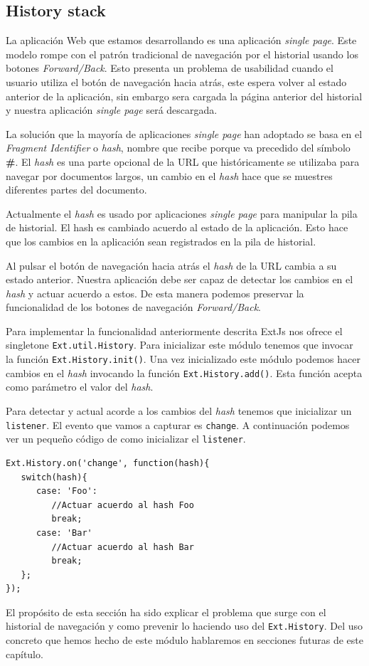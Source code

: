 	\subsection{History stack}
		La aplicación Web que estamos desarrollando es una aplicación \emph{single page}. Este modelo rompe con el patrón tradicional de
		navegación por el historial usando los botones \emph{Forward/Back}. Esto presenta un problema de usabilidad cuando el usuario utiliza
		el botón de navegación hacia atrás, este espera volver al estado anterior de la aplicación, sin embargo sera cargada la página
		anterior del historial y nuestra aplicación \emph{single page} será descargada.
		\par
		La solución que la mayoría de aplicaciones \emph{single page} han adoptado se basa en el \emph{Fragment Identifier}  o \emph{hash},
		nombre que recibe porque va precedido del símbolo \textbf{\#}. El \emph{hash} es una parte opcional de la URL que históricamente se
		utilizaba para navegar por documentos largos, un cambio en el \emph{hash} hace que se muestres diferentes partes del documento.
		\par
		Actualmente el \emph{hash} es usado por aplicaciones \emph{single page} para manipular la pila de historial. El hash es cambiado
		acuerdo al estado de la aplicación. Esto hace que los cambios en la aplicación sean registrados en la pila de historial.
		\par
		Al pulsar el botón de navegación hacia atrás el \emph{hash} de la URL cambia a su estado anterior. Nuestra aplicación debe ser capaz
		de detectar los cambios en el \emph{hash} y actuar acuerdo a estos. De esta manera podemos preservar la funcionalidad de los botones
		de navegación \emph{Forward/Back}. 
		\par
		Para implementar la funcionalidad anteriormente descrita ExtJs nos ofrece el singletone \texttt{Ext.util.History}. Para inicializar
		este módulo tenemos que invocar la función \texttt{Ext.History.init()}. Una vez inicializado este módulo podemos hacer cambios en el
		\emph{hash} invocando la función \texttt{Ext.History.add()}. Esta función acepta como parámetro el valor del \emph{hash}. 
		\par
		Para detectar y actual acorde a los cambios del \emph{hash} tenemos que inicializar un \texttt{listener}. El evento que vamos a
		capturar es \texttt{change}. A continuación podemos ver un pequeño código de como inicializar el \texttt{listener}.
		\begin{lstlisting}
Ext.History.on('change', function(hash){
   switch(hash){
      case: 'Foo':
         //Actuar acuerdo al hash Foo
         break;
      case: 'Bar'
         //Actuar acuerdo al hash Bar
         break;
   };
});
		\end{lstlisting}
		\par
		El propósito de esta sección ha sido explicar el problema que surge con el historial de navegación y como prevenir lo haciendo uso del
		\texttt{Ext.History}. Del uso concreto que hemos hecho de este módulo hablaremos en secciones futuras de este capítulo.

